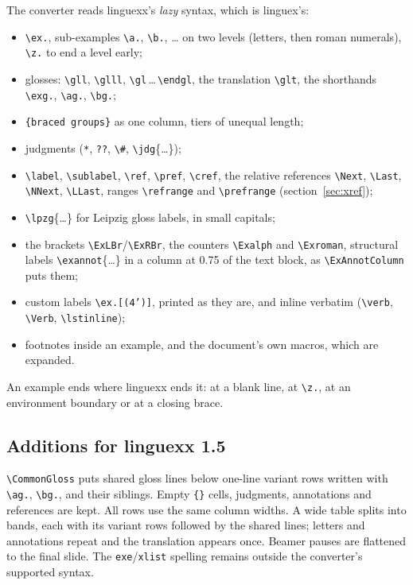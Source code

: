 \documentclass[11pt,a4paper]{article}
\newcommand{\cs}[1]{\texttt{\textbackslash #1}}
\newcommand{\pkg}[1]{\textsf{#1}}
\begin{document}
The converter reads \pkg{linguexx}'s \emph{lazy} syntax, which is
\pkg{linguex}'s:
\begin{itemize}[nosep]
\item \cs{ex.}, sub-examples \cs{a.}, \cs{b.}, \ldots{} on two levels
  (letters, then roman numerals), \cs{z.} to end a level early;
\item glosses: \cs{gll}, \cs{glll}, \cs{gl}\,\ldots\,\cs{endgl}, the
  translation \cs{glt}, the shorthands \cs{exg.}, \cs{ag.}, \cs{bg.};
\item \texttt{\{braced groups\}} as one column, tiers of unequal length;
\item judgments (\texttt{*}, \texttt{??}, \cs{\#}, \cs{jdg}\{\ldots\});
\item \cs{label}, \cs{sublabel}, \cs{ref}, \cs{pref}, \cs{cref}, the relative
  references \cs{Next}, \cs{Last}, \cs{NNext}, \cs{LLast}, ranges
  \cs{refrange} and \cs{prefrange} (section~\ref{sec:xref});
\item \cs{lpzg}\{\ldots\} for Leipzig gloss labels, in small capitals;
\item the brackets \cs{ExLBr}/\cs{ExRBr}, the counters \cs{Exalph} and
  \cs{Exroman}, structural labels \cs{exannot}\{\ldots\} in a column at
  0.75 of the text block, as \cs{ExAnnotColumn} puts them;
\item custom labels \cs{ex.[(4')]}, printed as they are, and inline verbatim
  (\cs{verb}, \cs{Verb}, \cs{lstinline});
\item footnotes inside an example, and the document's own macros, which are
  expanded.
\end{itemize}

An example ends where \pkg{linguexx} ends it: at a blank line, at \cs{z.},
at an environment boundary or at a closing brace.

\subsection{Additions for linguexx 1.5}

\cs{CommonGloss} puts shared gloss lines below one-line variant rows
written with \cs{ag.}, \cs{bg.}, and their siblings. Empty \texttt{\{\}}
cells, judgments, annotations and references are kept. All rows use the
same column widths. A wide table splits into bands, each with its variant
rows followed by the shared lines; letters and annotations repeat and the
translation appears once. Beamer pauses are flattened to the final slide.
The \texttt{exe}/\texttt{xlist} spelling remains outside the converter's
supported syntax.
\end{document}
